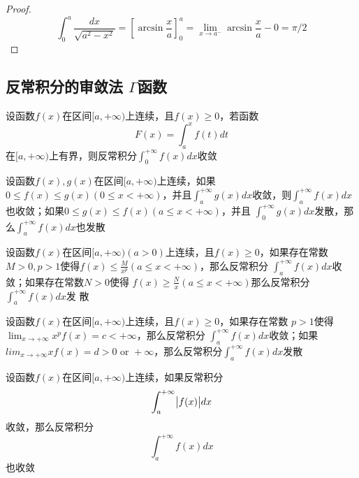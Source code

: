 \documentclass[11pt]{article}
\begin{document}
\begin{proof}
\begin{equation*}
\int_0^a\frac{dx}{\sqrt{a^2-x^2}}=[\arcsin\frac{x}{a}]^a_0=\lim_{x\to a^-}
\arcsin \frac{x}{a}-0=\pi/2
\end{equation*}
\end{proof}
\subsection{反常积分的审敛法 \(Γ\)函数}
\label{sec:org92b5cda}
\begin{theorem}[]
设函数\(f(x)\)在区间\([a,+\infty)\)上连续，且\(f(x)\ge0\)，若函数
\begin{equation*}
F(x)=\int_a^xf(t)dt
\end{equation*}
在\([a,+\infty)\)上有界，则反常积分\(\int_0^{+\infty}f(x)dx\)收敛
\end{theorem}

\begin{theorem}[比较审敛原理]
设函数\(f(x),g(x)\)在区间\([a,+\infty)\)上连续，如果\(0\le f(x)\le g(x)(0\le
   x<+\infty)\)，并且\(\int_a^{+\infty}g(x)dx\)收敛，则\(\int_a^{+\infty}f(x)dx\)
也收敛；如果\(0\le g(x)\le f(x)(a\le x<+\infty)\)，并且
\(\int_0^{+\infty}g(x)dx\)发散，那么\(\int_a^{+\infty}f(x)dx\)也发散
\end{theorem}

\begin{theorem}[比较审敛法 1]
设函数\(f(x)\)在区间\([a,+\infty)(a>0)\)上连续，且\(f(x)\ge0\)，如果存在常数
\(M>0,p>1\)使得\(f(x)\le\frac{M}{x^p}(a\le x<+\infty)\)，那么反常积分
\(\int_a^{+\infty}f(x)dx\)收敛；如果存在常数\(N>0\)使得
\(f(x)\ge\frac{N}{x}(a\le x<+\infty)\)那么反常积分\(\int_a^{+\infty}f(x)dx\)发
散
\end{theorem}

\begin{theorem}[极限审敛法 1]
设函数\(f(x)\)在区间\([a,+\infty)\)上连续，且\(f(x)\ge0\)，如果存在常数
\(p>1\)使得\(\lim_{x\to+\infty}x^pf(x)=c<+\infty\)，那么反常积分
\(\int_a^{+\infty}f(x)dx\)收敛；如果\(lim_{x\to+\infty}xf(x)=d>0\text{ or
   }+\infty\)，那么反常积分\(\int_a^{+\infty}f(x)dx\)发散
\end{theorem}

\begin{theorem}[]
设函数\(f(x)\)在区间\([a,+\infty)\)上连续，如果反常积分
\begin{equation*}
\int_a^{+\infty}\abs{f(x)}dx
\end{equation*}
收敛，那么反常积分
\begin{equation*}
\int_a^{+\infty}f(x)dx
\end{equation*}
也收敛
\end{theorem}
\end{document}
